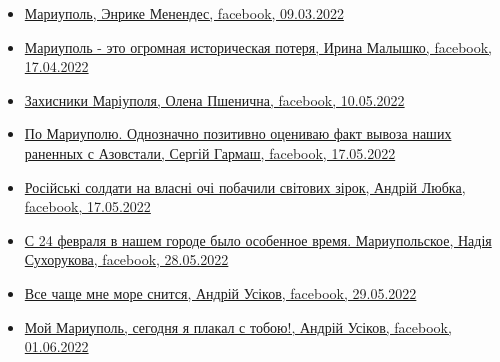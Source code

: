 \begin{itemize} %

\item \hyperlink{09_03_2022.fb.menendes_enrike.1.mariupol}{%
Мариуполь, Энрике Менендес, facebook, 09.03.2022
}

\item \hyperlink{17_04_2022.fb.malyshko_irina.1.mariupol_muzej}{%
Мариуполь - это огромная историческая потеря, Ирина Малышко, facebook, 17.04.2022%
}

\item \hyperlink{10_05_2022.fb.pshenychna_olena.kiev.1.zahysnyky_mariupolja}{%
Захисники Маріуполя, Олена Пшенична, facebook, 10.05.2022%
}

\item \hyperlink{17_05_2022.fb.garmash_sergej.1.po_mariupolju}{%
По Мариуполю. Однозначно позитивно оцениваю факт вывоза наших раненных с Азовстали, Сергій Гармаш, facebook, %
17.05.2022%
}

\item \hyperlink{17_05_2022.fb.ljubka_andrii.1.zirky_geroi_rosiane}{%
Російські солдати на власні очі побачили світових зірок, Андрій Любка, facebook, 17.05.2022%
}

\item \hyperlink{28_05_2022.fb.suhorukova_nadia.mariupol.1.vremja_gorod}{%
С 24 февраля в нашем городе было особенное время. Мариупольское, Надія Сухорукова, facebook, 28.05.2022%
}

\item \hyperlink{29_05_2022.fb.usikov_andrij.1.more_mariupol}{%
Все чаще мне море снится, Андрій Усіков, facebook, 29.05.2022%
}

\item \hyperlink{01_06_2022.fb.usikov_andrij.1.moj_mariupol_plakal_s_toboju}{%
Мой Мариуполь, сегодня я плакал с тобою!, Андрій Усіков, facebook, 01.06.2022%
}

\end{itemize} %


